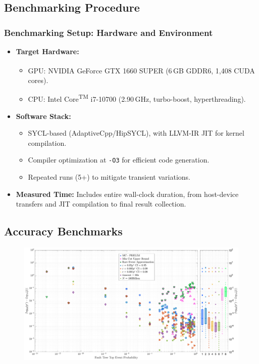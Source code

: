 \subsection{Benchmarking Procedure}
\begin{frame}[t]
\frametitle{Benchmarking Setup: Hardware and Environment}
\begin{itemize}
  \item \textbf{Target Hardware:}
    \begin{itemize}
      \item GPU: NVIDIA\textsuperscript{\textregistered} GeForce GTX 1660 SUPER (6\,GB GDDR6, 1{,}408 CUDA cores).
      \item CPU: Intel\textsuperscript{\textregistered} Core\textsuperscript{TM} i7-10700 (2.90\,GHz, turbo-boost, hyperthreading).
    \end{itemize}
  \item \textbf{Software Stack:}
    \begin{itemize}
      \item SYCL-based (AdaptiveCpp/HipSYCL), with LLVM-IR JIT for kernel compilation.
      \item Compiler optimization at \texttt{-O3} for efficient code generation.
      \item Repeated runs (5+) to mitigate transient variations.
    \end{itemize}
  \item \textbf{Measured Time:} Includes entire wall-clock duration, from host-device transfers and JIT compilation to final result collection.
\end{itemize}
\end{frame}

\subsection{Accuracy Benchmarks}
\begin{frame}
    \begin{figure}[h]
    \centering
    \includegraphics[height=1.1\textheight]{4_casestudy/abs_err.eps}
    \label{fig:mae_vs_logp}
\end{figure}
\end{frame}


